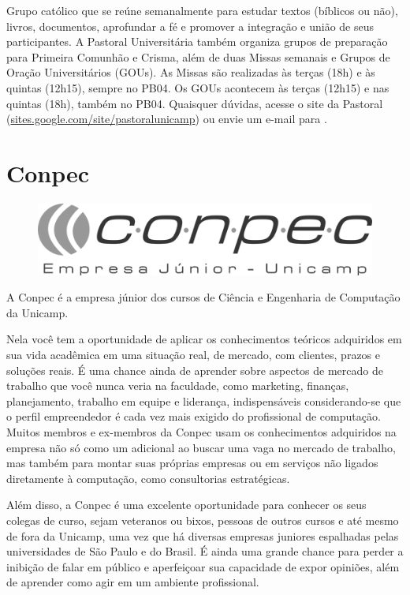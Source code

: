 Grupo católico que se reúne semanalmente para estudar textos (bíblicos ou não),
livros, documentos, aprofundar a fé e promover a integração e união de seus
participantes. A Pastoral Universitária também organiza grupos de preparação
para Primeira Comunhão e Crisma, além de duas Missas semanais e Grupos de Oração
Universitários (GOUs). As Missas são realizadas às terças (18h) e às
quintas (12h15), sempre no PB04. Os GOUs acontecem às terças (12h15) e
nas quintas (18h), também no PB04. Quaisquer dúvidas, acesse o site da
Pastoral (\url{sites.google.com/site/pastoralunicamp}) ou
envie um e-mail para .

\newpage
\section{Conpec}

\begin{figure}[H]
    \centering
    \includegraphics[scale=0.40]{img/conpec.png}
\end{figure}

A Conpec é a empresa júnior dos cursos de Ciência e Engenharia de Computação da
Unicamp.

Nela você tem a oportunidade de aplicar os conhecimentos teóricos
adquiridos em sua vida acadêmica em uma situação real, de mercado, com clientes,
prazos e soluções reais. É uma chance ainda de aprender sobre aspectos de mercado de trabalho que você
nunca veria na faculdade, como marketing, finanças, planejamento, trabalho em equipe e liderança,
indispensáveis considerando-se que o perfil empreendedor é cada vez mais exigido do profissional de
computação. Muitos membros e ex-membros da Conpec usam os
conhecimentos adquiridos na empresa não só como um adicional ao buscar uma vaga
no mercado de trabalho, mas também para montar suas próprias empresas ou em
serviços não ligados diretamente à computação, como consultorias estratégicas.

Além disso, a Conpec é uma excelente oportunidade para conhecer os seus colegas
de curso, sejam veteranos ou bixos, pessoas de outros cursos e até mesmo de fora da
Unicamp, uma vez que há diversas empresas juniores espalhadas pelas universidades de São Paulo e do Brasil. É ainda uma grande chance para perder a inibição de falar em
público e aperfeiçoar sua capacidade de expor opiniões, além de aprender como
agir em um ambiente profissional.

